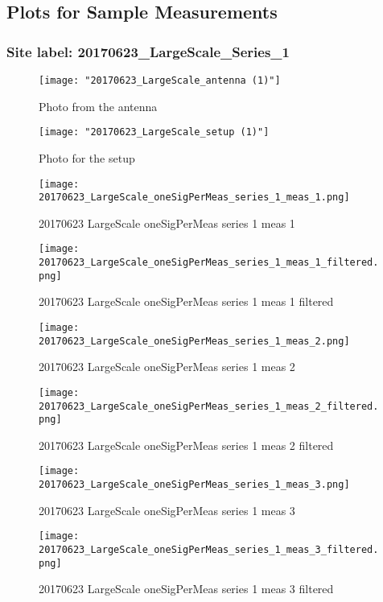\subsection{Plots for Sample Measurements}
\subsubsection{Site label: 20170623\_LargeScale\_Series\_1}
\begin{figure}[ht] \caption{Photo from the antenna}
\texttt{[image: "20170623\_LargeScale\_antenna (1)"]}\centering\end{figure}
\begin{figure}[ht] \caption{Photo for the setup}
\texttt{[image: "20170623\_LargeScale\_setup (1)"]}\centering\end{figure}
\begin{figure}[ht] \caption{20170623 LargeScale oneSigPerMeas series 1 meas 1}
\texttt{[image: 20170623\_LargeScale\_oneSigPerMeas\_series\_1\_meas\_1.png]}\centering\end{figure}
\begin{figure}[ht] \caption{20170623 LargeScale oneSigPerMeas series 1 meas 1 filtered}
\texttt{[image: 20170623\_LargeScale\_oneSigPerMeas\_series\_1\_meas\_1\_filtered.png]}\centering\end{figure}
\begin{figure}[ht] \caption{20170623 LargeScale oneSigPerMeas series 1 meas 2}
\texttt{[image: 20170623\_LargeScale\_oneSigPerMeas\_series\_1\_meas\_2.png]}\centering\end{figure}
\begin{figure}[ht] \caption{20170623 LargeScale oneSigPerMeas series 1 meas 2 filtered}
\texttt{[image: 20170623\_LargeScale\_oneSigPerMeas\_series\_1\_meas\_2\_filtered.png]}\centering\end{figure}
\begin{figure}[ht] \caption{20170623 LargeScale oneSigPerMeas series 1 meas 3}
\texttt{[image: 20170623\_LargeScale\_oneSigPerMeas\_series\_1\_meas\_3.png]}\centering\end{figure}
\begin{figure}[ht] \caption{20170623 LargeScale oneSigPerMeas series 1 meas 3 filtered}
\texttt{[image: 20170623\_LargeScale\_oneSigPerMeas\_series\_1\_meas\_3\_filtered.png]}\centering\end{figure}
\clearpage
